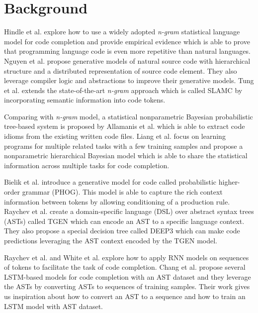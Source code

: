 \documentclass[T, E]{compsoft}
\begin{document}
\section{Background}
Hindle et al.\cite{hindle2012naturalness} explore how to use a widely adopted \textit{n-gram} statistical language model for code completion and provide empirical evidence which is able to prove that programming language code is even more repetitive than natural languages. 
Nguyen et al.\cite{DBLP:journals/corr/MaddisonT14} propose generative models of natural source code with hierarchical structure and a distributed representation of source code element. 
They also leverage compiler logic and abstractions to improve their generative models. 
Tung et al.\cite{Nguyen:2013:SSL:2491411.2491458} extends the state-of-the-art \textit{n-gram} approach which is called SLAMC by incorporating semantic information into code tokens. 


Comparing with \textit{n-gram} model, a statistical nonparametric Bayesian probabilistic tree-based system\cite{allamanis2014mining} is proposed by Allamanis et al. which is able to extract code idioms from the existing written code files.
Liang et al.\cite{liang2010learning} focus on learning programs for multiple related tasks with a few training samples and propose a nonparametric hierarchical Bayesian model which is able to share the statistical information across multiple tasks for code completion.

Bielik et al.\cite{bielik2016phog} introduce a generative model for code called probabilistic higher-order grammar (PHOG). This model is able to capture the rich context information between tokens by allowing conditioning of a production rule. 
Raychev et al.\cite{raychev2016probabilistic} create a domain-specific language (DSL) over abstract syntax trees (ASTs) called TGEN which can encode an AST to a specific language context.
They also propose a special decision tree called DEEP3 which can make code predictions leveraging the AST context encoded by the TGEN model.

Raychev et al.\cite{raychev2014code} and White et al.\cite{white2015toward} explore how to apply RNN models on sequences of tokens to facilitate the task of code completion. 
Chang et al.\cite{liu2016neural} propose several LSTM-based models for code completion with an AST dataset and they leverage the ASTs by converting ASTs to sequences of training samples. 
Their work gives us inspiration about how to convert an AST to a sequence and how to train an LSTM model with AST dataset. 
\end{document}
